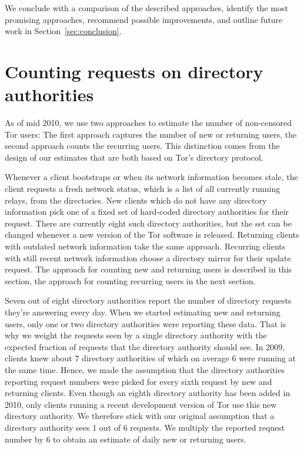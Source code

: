 \documentclass{article}
\begin{document}
We conclude with a comparison of the described approaches, identify the
most promising approaches, recommend possible improvements, and outline
future work in Section~\ref{sec:conclusion}.

\section{Counting requests on directory authorities}
\label{sec:auths}

As of mid 2010, we use two approaches to estimate the number of
non-censored Tor users:
The first approach captures the number of new or returning users, the
second approach counts the recurring users.
This distinction comes from the design of our estimates that are both
based on Tor's directory protocol.

Whenever a client bootstraps or when its network information becomes
stale, the client requests a fresh network status, which is a list of all
currently running relays, from the directories.
New clients which do not have any directory information pick one of
a fixed set of hard-coded directory authorities for their request.
There are currently eight such directory authorities, but the set can be
changed whenever a new version of the Tor software is released.
Returning clients with outdated network information take the same
approach.
Recurring clients with still recent network information choose a directory
mirror for their update request.
The approach for counting new and returning users is described in this
section, the approach for counting recurring users in the next section.

Seven out of eight directory authorities report the number of directory
requests they're answering every day.
When we started estimating new and returning users, only one or two
directory authorities were reporting these data.
That is why we weight the requests seen by a single directory authority
with the expected fraction of requests that the directory authority should
see.
In 2009, clients knew about 7 directory authorities of which on average 6
were running at the same time.
Hence, we made the assumption that the directory authorities reporting
request numbers were picked for every sixth request by new and returning
clients.
Even though an eighth directory authority has been added in 2010, only
clients running a recent development version of Tor use this new directory
authority.
We therefore stick with our original assumption that a directory authority
sees 1 out of 6 requests.
We multiply the reported request number by 6 to obtain an estimate of
daily new or returning users.
\end{document}

